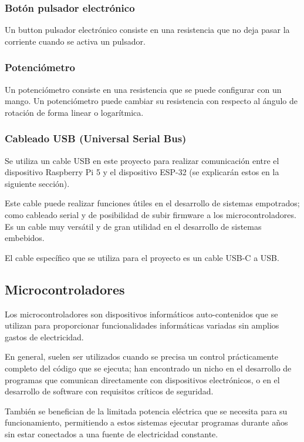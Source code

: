 \documentclass[12pt,a4paper,twoside,openright]{book}
\begin{document}
\subsubsection{Botón pulsador electrónico}

Un button pulsador electrónico consiste en una resistencia que no deja pasar la corriente cuando se activa un pulsador. \cite{pushbuttonswitch}

\subsubsection{Potenciómetro}

Un potenciómetro consiste en una resistencia que se puede configurar con un mango. Un potenciómetro puede cambiar su resistencia con respecto al ángulo de rotación de forma linear o logarítmica.\cite{potentiometer1}

\subsubsection{Cableado USB (Universal Serial Bus)}

Se utiliza un cable USB en este proyecto para realizar comunicación entre el dispositivo Raspberry Pi 5 y el dispositivo ESP-32 (se explicarán estos en la siguiente sección). 

Este cable puede realizar funciones útiles en el desarrollo de sistemas empotrados; como cableado serial y de posibilidad de subir firmware a los microcontroladores. Es un cable muy versátil y de gran utilidad en el desarrollo de sistemas embebidos.

El cable específico que se utiliza para el proyecto es un cable USB-C a USB.

\subsection{Microcontroladores}

Los microcontroladores son dispositivos informáticos auto-contenidos que se utilizan para proporcionar funcionalidades informáticas variadas sin amplios gastos de electricidad.

En general, suelen ser utilizados cuando se precisa un control prácticamente completo del código que se ejecuta; han encontrado un nicho en el desarrollo de programas que comunican directamente con dispositivos electrónicos, o en el desarrollo de software con requisitos críticos de seguridad.

También se benefician de la limitada potencia eléctrica que se necesita para su funcionamiento, permitiendo a estos sistemas ejecutar programas durante años sin estar conectados a una fuente de electricidad constante.
\end{document}
